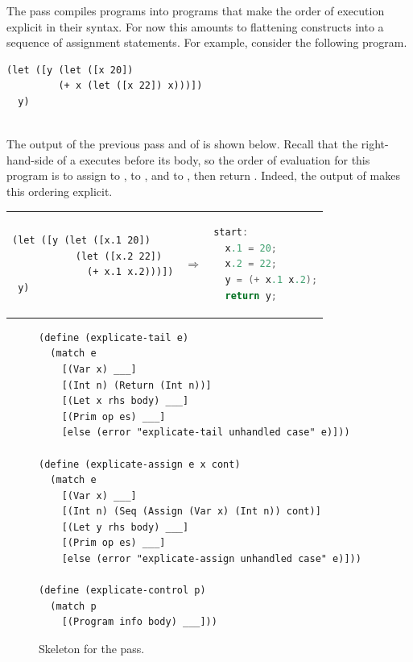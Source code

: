 \documentclass[11pt]{book}
\begin{document}
The  pass compiles \LangVar{} programs into \LangCVar{}
programs that make the order of execution explicit in their
syntax. For now this amounts to flattening  constructs into a
sequence of assignment statements. For example, consider the following
\LangVar{} program.\\
\begin{minipage}{0.96\textwidth}
\begin{lstlisting}
(let ([y (let ([x 20])
         (+ x (let ([x 22]) x)))])
  y)
\end{lstlisting}
\end{minipage}\\
%
The output of the previous pass and of  is
shown below. Recall that the right-hand-side of a  executes
before its body, so the order of evaluation for this program is to
assign  to ,  to , and
 to , then return . Indeed, the
output of  makes this ordering explicit.\\
\begin{tabular}{lll}
\begin{minipage}{0.4\textwidth}
\begin{lstlisting}
(let ([y (let ([x.1 20]) 
           (let ([x.2 22])
             (+ x.1 x.2)))])
 y)
\end{lstlisting}
\end{minipage}
&
$\Rightarrow$
&
\begin{minipage}{0.4\textwidth}
\begin{lstlisting}[language=C]
start:
  x.1 = 20;
  x.2 = 22;
  y = (+ x.1 x.2);
  return y;
\end{lstlisting}
\end{minipage}
\end{tabular}
%
\begin{figure}[tbp]
\begin{lstlisting}
(define (explicate-tail e)
  (match e
    [(Var x) ___]
    [(Int n) (Return (Int n))]
    [(Let x rhs body) ___]
    [(Prim op es) ___]
    [else (error "explicate-tail unhandled case" e)]))

(define (explicate-assign e x cont)
  (match e
    [(Var x) ___]
    [(Int n) (Seq (Assign (Var x) (Int n)) cont)]
    [(Let y rhs body) ___]
    [(Prim op es) ___]
    [else (error "explicate-assign unhandled case" e)]))

(define (explicate-control p)
  (match p
    [(Program info body) ___]))
\end{lstlisting}
\caption{Skeleton for the  pass.}
\label{fig:explicate-control-Rvar}
\end{figure}
\end{document}
